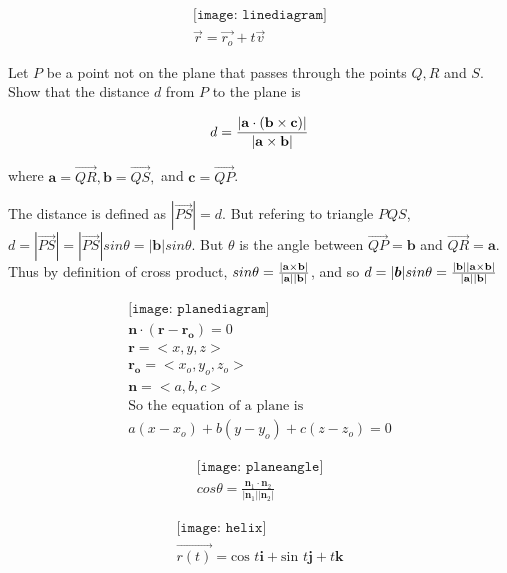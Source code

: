 \documentclass{article}
\begin{document}
\begin{gather*}
   \texttt{[image: linediagram]}
   \\
   \vec{r} = \vec{r_o} + t\vec{v}
\end{gather*}

Let $P$ be a point not on the plane that passes through the points $Q,R$ and $S$. Show that the distance $d$ from $P$ to the plane is

\begin{equation*}
   d = \frac{|\bf{a}\cdot(\bf{b}\times\bf{c})|}{|\bf{a}\times\bf{b}|}
\end{equation*}

where $\boldsymbol{a} = \vec{QR}, \boldsymbol{b} = \vec{QS},$ and $\boldsymbol{c} = \vec{QP}$.

The distance is defined as $|\vec{PS}| = d$. But refering to triangle $PQS$, $d = |\vec{PS}| = |\vec{PS}|sin\theta = |\boldsymbol{b}|sin\theta$. But $\theta$ is the angle between $\vec{QP} = \boldsymbol{b}$ and $\vec{QR} = \boldsymbol{a}$. Thus by definition of cross product, $sin\theta = \frac{|\bf{a}\times\bf{b}|}{|\bf{a}||\bf{b}|}$, and so $d = |\boldsymbol{b}|sin\theta = \frac{|\bf{b}||\bf{a}\times\bf{b}|}{|\bf{a}||\bf{b}|}$

\begin{gather*}
   \texttt{[image: planediagram]}
   \\
   \boldsymbol{n}\cdot(\boldsymbol{r} - \boldsymbol{r_o}) = 0
   \\
   \boldsymbol{r} = <x,y,z>
   \\
   \boldsymbol{r_o} = <x_o,y_o,z_o>
   \\
   \boldsymbol{n} = <a,b,c>
   \\
   \text{So the equation of a plane is}
   \\
   a(x - x_o) + b(y - y_o) + c(z - z_o) = 0
\end{gather*}

\begin{gather*}
   \texttt{[image: planeangle]}
   \\
   cos\theta = \frac{\boldsymbol{n}_1\cdot\boldsymbol{n}_2}{|\boldsymbol{n}_1||\boldsymbol{n}_2|}
\end{gather*}

\begin{gather*}
   \texttt{[image: helix]}
   \\
   \vec{r(t)} = \text{cos } t\boldsymbol{i} + \text{sin }t\boldsymbol{j} + t\boldsymbol{k}
\end{gather*}
\end{document}
